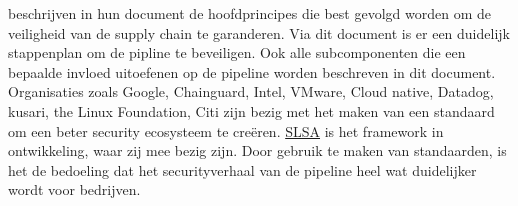 \textcite{Foundation2021} beschrijven in hun document de hoofdprincipes die best gevolgd worden om de veiligheid van de supply chain te garanderen. Via dit document is er een duidelijk stappenplan om de pipline te beveiligen. Ook alle subcomponenten die een bepaalde invloed uitoefenen op de pipeline worden beschreven in dit document. Organisaties zoals Google, Chainguard, Intel, VMware, Cloud native, Datadog, kusari, the Linux Foundation, Citi zijn bezig met het maken van een standaard om een beter security ecosysteem te creëren. \href{https://slsa.dev}{SLSA} is het framework in ontwikkeling, waar zij mee bezig zijn. Door gebruik te maken van standaarden, is het de bedoeling dat het securityverhaal van de pipeline heel wat duidelijker wordt voor bedrijven. 
